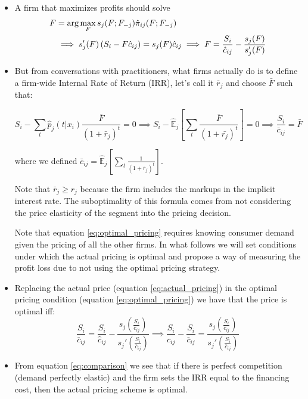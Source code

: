 \documentclass[12pt]{article}
\theoremstyle{plain}
\theoremstyle{plain}
\begin{document}
\begin{itemize}

\item A firm that maximizes profits should solve 
\begin{align}\label{eq:optimal_pricing}
F&=\arg\max_{F}s_{j}(F;F_{-j})\hat{\pi}_{ij}(F;F_{-j})\notag\\
&\implies s_{j}'(F)\left(S_{i}-F\hat{c}_{ij}\right)=s_{j}(F)\hat{c}_{ij}\implies F=\frac{S_{i}}{\hat{c}_{ij}}-\frac{s_{j}(F)}{s_{j}'(F)}
\end{align}

\item But from conversations with practitioners, what firms actually do
is to define a firm-wide Internal Rate of Return (IRR), let's call
it $\bar{r}_{j}$ and choose $\bar{F}$ such that: 

\begin{equation}\label{eq:actual_pricing}
S_{i}-\sum_{t}\hat{p}_{j}(t|x_{i}) \frac{\bar{F}}{(1+\bar{r}_{j})^{t}}=0
\implies S_{i}-\hat{\mathbb{E}}_j\left[\sum_{t}\frac{\bar{F}}{(1+\bar{r_{j}})^{t}}\right]=0
\implies\frac{S_{i}}{\bar{c}_{ij}}=\bar{F}
\end{equation}

where we defined $\bar{c}_{ij}=\hat{\mathbb{E}}_{j}\left[\sum_{t}\frac{1}{(1+\bar{r}_{j})^{t}}\right]$.

 
Note that $\bar{r}_{j}\geq r_{j}$ because the firm includes the markups in the implicit interest rate. The suboptimality of this formula comes from not considering the price elasticity of the segment into the pricing decision. 

Note that equation \ref{eq:optimal_pricing} requires knowing consumer
demand given the pricing of all the other firms. In what follows we
will set conditions under which the actual pricing is optimal and
propose a way of measuring the profit loss due to not using the optimal
pricing strategy. 
\item Replacing the actual price (equation \ref{eq:actual_pricing}) in the optimal pricing condition (equation \ref{eq:optimal_pricing}) we have
that the price is optimal iff: 
\begin{equation}\label{eq:comparison}
\frac{S_{i}}{\bar{c}_{ij}} =\frac{S_{i}}{\hat{c}_{ij}}-\frac{s_{j}\left(\frac{S_{i}}{\bar{c}_{ij}}\right)}{s_{j}'\left(\frac{S_{i}}{\bar{c}_{ij}}\right)}
\implies\frac{S_{i}}{\hat{c}_{ij}}-\frac{S_{i}}{\bar{c}_{ij}}=\frac{s_{j}\left(\frac{S_{i}}{\bar{c}_{ij}}\right)}{s_{j}'\left(\frac{S_{i}}{\bar{c}_{ij}}\right)}
\end{equation}
\item From equation \ref{eq:comparison} we see that if there is perfect competition (demand perfectly elastic) and the firm sets the IRR equal to the financing cost,  then the actual pricing scheme
is optimal. 
\end{itemize}
\end{document}
